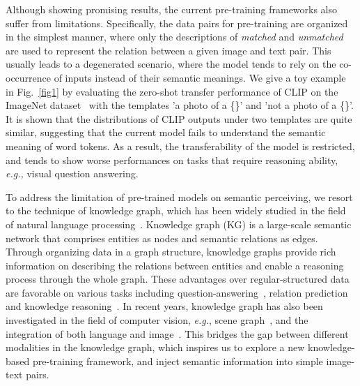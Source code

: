 Although showing promising results, the current pre-training frameworks also suffer from limitations. Specifically, the data pairs for pre-training are organized in the simplest manner, where only the descriptions of \textit{matched} and \textit{unmatched} are used to represent the relation between a given image and text pair. This usually leads to a degenerated scenario, where the model tends to rely on the co-occurrence of inputs instead of their semantic meanings. 
We give a toy example in Fig.~\ref{fig1} by evaluating the zero-shot transfer performance of CLIP on the ImageNet dataset~\cite{imagenet} with the templates 'a photo of a \{\}' and 'not a photo of a \{\}'. It is shown that the distributions of CLIP outputs under two templates are quite similar, suggesting that the current model fails to understand the semantic meaning of word tokens. As a result, the transferability of the model is restricted, and tends to show worse performances on tasks that require reasoning ability, \textit{e.g.,} visual question answering.




To address the limitation of pre-trained models on semantic perceiving, we resort to the technique of knowledge graph, which has been widely studied in the field of natural language processing~\cite{kgreason,kgembed}. Knowledge graph (KG) is a large-scale semantic network that comprises entities as nodes and semantic relations as edges. Through organizing data in a graph structure, knowledge graphs provide rich information on describing the relations between entities and enable a reasoning process through the whole graph. These advantages over regular-structured data are favorable on various tasks including question-answering~\cite{kgqa, kgqa2}, relation prediction~\cite{kgrel2,kgrel} and knowledge reasoning~\cite{kgkreason, kgkreason2}. In recent years, knowledge graph has also been investigated in the field of computer vision, \textit{e.g.}, scene graph~\cite{sggen}, and the integration of both language and image~\cite{visualsem}. This bridges the gap between different modalities in the knowledge graph, which inspires us to explore a new knowledge-based pre-training framework, and inject semantic information into simple image-text pairs.

